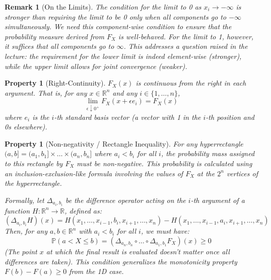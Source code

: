 \documentclass[11pt]{article}
\newtheorem{property}[theorem]{Property}
\newtheorem{remark}[theorem]{Remark}
\theoremstyle{definition} %
\newcommand{\R}{\mathbb{R}} %
\renewcommand{\P}{\mathbb{P}} %
\begin{document}
\begin{remark}[On the Limits]
    The condition for the limit to 0 as $x_i \to -\infty$ is stronger than requiring the limit to be 0 only when all components go to $-\infty$ simultaneously. We need this component-wise condition to ensure that the probability measure derived from $F_X$ is well-behaved. For the limit to 1, however, it suffices that all components go to $\infty$. This addresses a question raised in the lecture: the requirement for the lower limit is indeed element-wise (stronger), while the upper limit allows for joint convergence (weaker).
\end{remark}

\begin{property}[Right-Continuity] \label{prop:cdf_rightcont}
$F_X(x)$ is continuous from the right in each argument. That is, for any $x \in \R^n$ and any $i \in \{1, \dots, n\}$,
\[ \lim_{\epsilon \downarrow 0^+} F_X(x + \epsilon e_i) = F_X(x) \]
where $e_i$ is the $i$-th standard basis vector (a vector with 1 in the $i$-th position and 0s elsewhere).
\end{property}

\begin{property}[Non-negativity / Rectangle Inequality] \label{prop:cdf_nonneg}
For any hyperrectangle $(a, b] = (a_1, b_1] \times \dots \times (a_n, b_n]$ where $a_i < b_i$ for all $i$, the probability mass assigned to this rectangle by $F_X$ must be non-negative. This probability is calculated using an inclusion-exclusion-like formula involving the values of $F_X$ at the $2^n$ vertices of the hyperrectangle.

Formally, let $\Delta_{a_i, b_i}$ be the difference operator acting on the $i$-th argument of a function $H: \R^n \to \R$, defined as:
\[ (\Delta_{a_i, b_i} H)(x) = H(x_1, \dots, x_{i-1}, b_i, x_{i+1}, \dots, x_n) - H(x_1, \dots, x_{i-1}, a_i, x_{i+1}, \dots, x_n) \]
Then, for any $a, b \in \R^n$ with $a_i < b_i$ for all $i$, we must have:
\[ \P(a < X \le b) = (\Delta_{a_n, b_n} \circ \dots \circ \Delta_{a_1, b_1} F_X)(x) \ge 0 \]
(The point $x$ at which the final result is evaluated doesn't matter once all differences are taken). This condition generalizes the monotonicity property $F(b) - F(a) \ge 0$ from the 1D case.
\end{property}
\end{document}
